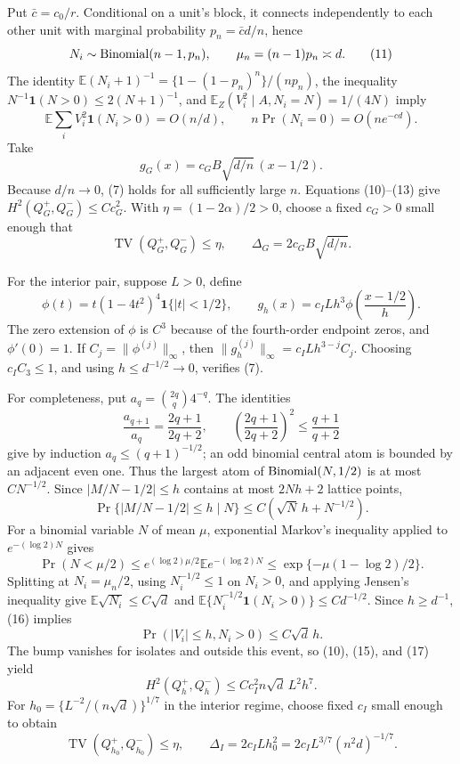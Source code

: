 Put \(\bar c=c_0/r\).  Conditional on a unit's block, it connects independently to each other unit with marginal probability \(p_n=\bar c d/n\), hence
\[
 N_i\sim{\rm Binomial}(n-1,p_n),
 \qquad \mu_n=(n-1)p_n\asymp d.
\tag{11}
\]
The identity \(\mathbb E(N_i+1)^{-1}=\{1-(1-p_n)^n\}/(np_n)\), the inequality \(N^{-1}\mathbf1(N>0)\leq2(N+1)^{-1}\), and \(\mathbb E_Z(V_i^2\mid A,N_i=N)=1/(4N)\) imply
\[
 \mathbb E\sum_iV_i^2\mathbf1(N_i>0)=O(n/d),
 \qquad n\Pr(N_i=0)=O(ne^{-cd}).
\tag{12}
\]
Take
\[
 g_G(x)=c_GB\sqrt{d/n}\,(x-1/2).
\tag{13}
\]
Because \(d/n\to0\), (7) holds for all sufficiently large \(n\).  Equations (10)--(13) give \(H^2(Q_G^+,Q_G^-)\leq Cc_G^2\).  With \(\eta=(1-2\alpha)/2>0\), choose a fixed \(c_G>0\) small enough that
\[
 \operatorname{TV}(Q_G^+,Q_G^-)\leq\eta,
 \qquad \Delta_G=2c_GB\sqrt{d/n}.
\tag{14}
\]

For the interior pair, suppose \(L>0\), define
\[
 \phi(t)=t(1-4t^2)^4\mathbf1\{|t|<1/2\},
 \qquad g_h(x)=c_ILh^3\phi\!\left(\frac{x-1/2}{h}\right).
\tag{15}
\]
The zero extension of \(\phi\) is \(C^3\) because of the fourth-order endpoint zeros, and \(\phi'(0)=1\).  If \(C_j=\|\phi^{(j)}\|_\infty\), then \(\|g_h^{(j)}\|_\infty=c_ILh^{3-j}C_j\).  Choosing \(c_IC_3\leq1\), and using \(h\leq d^{-1/2}\to0\), verifies (7).

For completeness, put \(a_q={2q\choose q}4^{-q}\).  The identities
\[
 \frac{a_{q+1}}{a_q}=\frac{2q+1}{2q+2},
 \qquad
 \left(\frac{2q+1}{2q+2}\right)^2\leq\frac{q+1}{q+2}
\]
give by induction \(a_q\leq(q+1)^{-1/2}\); an odd binomial central atom is bounded by an adjacent even one.  Thus the largest atom of \({\rm Binomial}(N,1/2)\) is at most \(CN^{-1/2}\).  Since \(|M/N-1/2|\leq h\) contains at most \(2Nh+2\) lattice points,
\[
 \Pr\{|M/N-1/2|\leq h\mid N\}\leq C(\sqrt N\,h+N^{-1/2}).
\tag{16}
\]
For a binomial variable \(N\) of mean \(\mu\), exponential Markov's inequality applied to \(e^{-(\log2)N}\) gives
\[
 \Pr(N<\mu/2)
 \leq e^{(\log2)\mu/2}\mathbb E e^{-(\log2)N}
 \leq\exp\{-\mu(1-\log2)/2\}.
\]
Splitting at \(N_i=\mu_n/2\), using \(N_i^{-1/2}\leq1\) on \(N_i>0\), and applying Jensen's inequality give \(\mathbb E\sqrt{N_i}\leq C\sqrt d\) and \(\mathbb E\{N_i^{-1/2}\mathbf1(N_i>0)\}\leq Cd^{-1/2}\).  Since \(h\geq d^{-1}\), (16) implies
\[
 \Pr(|V_i|\leq h,N_i>0)\leq C\sqrt d\,h.
\tag{17}
\]
The bump vanishes for isolates and outside this event, so (10), (15), and (17) yield
\[
 H^2(Q_h^+,Q_h^-)\leq Cc_I^2n\sqrt d\,L^2h^7.
\tag{18}
\]
For \(h_0=\{L^{-2}/(n\sqrt d)\}^{1/7}\) in the interior regime, choose fixed \(c_I\) small enough to obtain
\[
 \operatorname{TV}(Q_{h_0}^+,Q_{h_0}^-)\leq\eta,
 \qquad \Delta_I=2c_ILh_0^2
 =2c_IL^{3/7}(n^2d)^{-1/7}.
\tag{19}
\]


